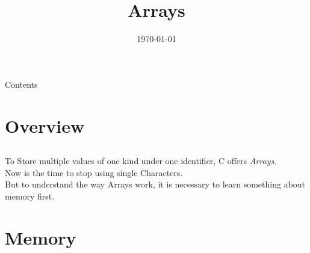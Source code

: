 
\usepackage{tikz}
\newcommand{\topic}{
	Arrays
}

\title{\topic}
\supertitle{\course}
\date{\today}



\maketitle

\begin{frame}{Contents}
	\tableofcontents
\end{frame}

\section{Overview}
\subsection{}
\begin{frame}
	To Store multiple values of one kind under one identifier, C offers \textit{Arrays}.\\
	Now is the time to stop using single Characters.\\
	But to understand the way Arrays work, it is necessary to learn something about memory first.
\end{frame}

\section{Memory}
